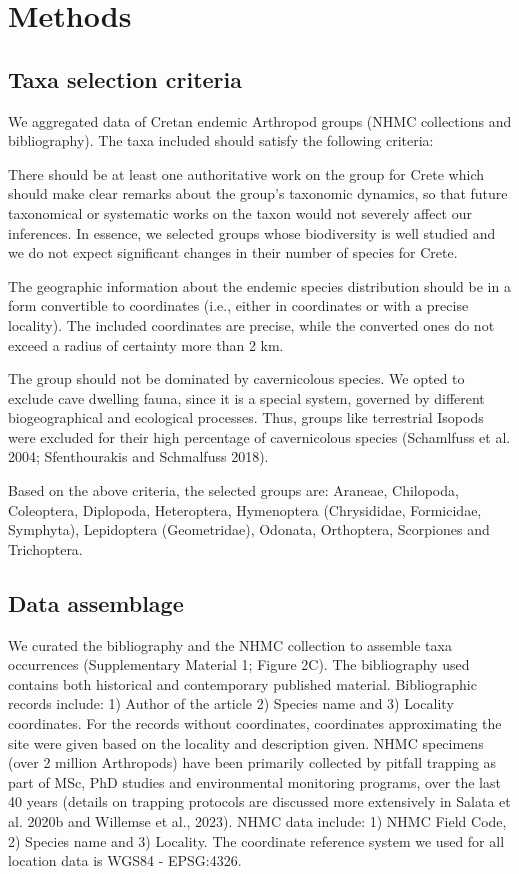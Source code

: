 \section{Methods}
\label{sec:arthropods-method}
   
    \subsection{Taxa selection criteria}
    \label{subsec:arthropods-taxa-selection}

We aggregated data of Cretan endemic Arthropod groups (NHMC collections and bibliography). The taxa included should satisfy the following criteria:

There should be at least one authoritative work on the group for Crete which
should make clear remarks about the group’s taxonomic dynamics, so that future
taxonomical or systematic works on the taxon would not severely affect our inferences.
In essence, we selected groups whose biodiversity is well studied and we do not
expect significant changes in their number of species for Crete. 

The geographic information about the endemic species distribution should be in
a form convertible to coordinates (i.e., either in coordinates or with a
precise locality). The included coordinates are precise, while the converted
ones do not exceed a radius of certainty more than 2 km.

The group should not be dominated by cavernicolous species. We opted to exclude
cave dwelling fauna, since it is a special system, governed by different
biogeographical and ecological processes. Thus, groups like terrestrial Isopods
were excluded for their high percentage of cavernicolous species (Schamlfuss et al. 2004; Sfenthourakis and Schmalfuss 2018).

Based on the above criteria, the selected groups are:
Araneae, Chilopoda, Coleoptera, Diplopoda, Heteroptera, Hymenoptera (Chrysididae, Formicidae, Symphyta), Lepidoptera (Geometridae), Odonata, Orthoptera, Scorpiones and Trichoptera.

    \subsection{Data assemblage}
    \label{subsec:arthropods-data-assemblage}

We curated the bibliography and the NHMC collection to assemble taxa
occurrences (Supplementary Material 1; Figure 2C). The bibliography used
contains both historical and contemporary published material. Bibliographic
records include: 1) Author of the article 2) Species name and 3) Locality coordinates.
For the records without coordinates, coordinates approximating the site were
given based on the locality and description given. NHMC specimens (over 2
million Arthropods) have been primarily collected by pitfall trapping as part
of MSc, PhD studies and environmental monitoring programs, over the last 40
years (details on trapping protocols are discussed more extensively in Salata et al. 2020b and Willemse et al., 2023).
NHMC data include: 1) NHMC Field Code, 2) Species name and 3) Locality.
The coordinate reference system we used for all location data is WGS84 - EPSG:4326.


